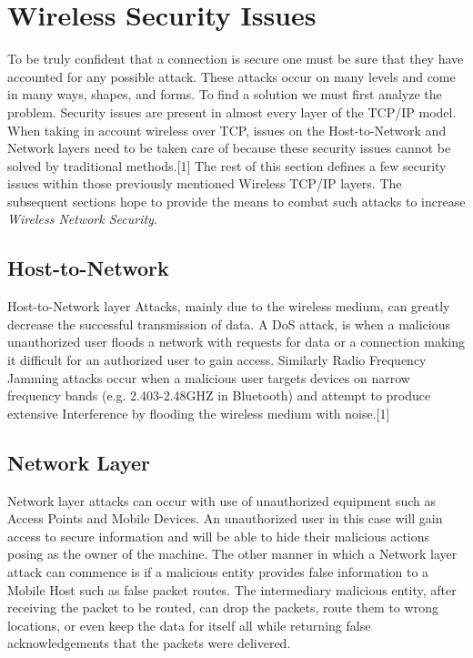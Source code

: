 \documentclass[11pt,onecolumn,cspaper,compsoc]{IEEEtran}
\begin{document}
\section{Wireless Security Issues}

\indent To be truly confident that a connection is secure one must be sure that they have accounted for any possible attack. These attacks 
occur on many levels and come in many ways, shapes, and forms. To find a solution we must first analyze the problem. Security issues are present 
in almost every layer of the TCP/IP model. When taking in account wireless over TCP, issues on the Host-to-Network and Network layers need to be 
taken care of because these security issues cannot be solved by traditional methods.[1] The rest of this section defines a few security issues 
within those previously mentioned Wireless TCP/IP layers. The subsequent sections hope to provide the means to combat such attacks to increase 
\textit{Wireless Network Security}.

\subsection*{Host-to-Network}

Host-to-Network layer Attacks, mainly due to the wireless medium, can greatly decrease the successful transmission of data. A DoS attack, is when 
a malicious unauthorized user floods a network with requests for data or a connection making it difficult for an authorized user to gain 
access. Similarly Radio Frequency Jamming attacks occur when a malicious user targets devices on narrow frequency bands (e.g. 2.403-2.48GHZ in 
Bluetooth) and attempt to produce extensive Interference by flooding the wireless medium with noise.[1]

\subsection*{Network Layer}

Network layer attacks can occur with use of unauthorized equipment such as Access Points and Mobile Devices. An unauthorized user in this case 
will gain access to secure information and will be able to hide their malicious actions posing as the owner of the machine. The other manner 
in which a Network layer attack can commence is if a malicious entity provides false information to a Mobile Host such as false packet routes. 
The intermediary malicious entity, after receiving the packet to be routed, can drop the packets, route them to wrong locations, or even keep 
the data for itself all while returning false acknowledgements that the packets were delivered. 
\end{document}
